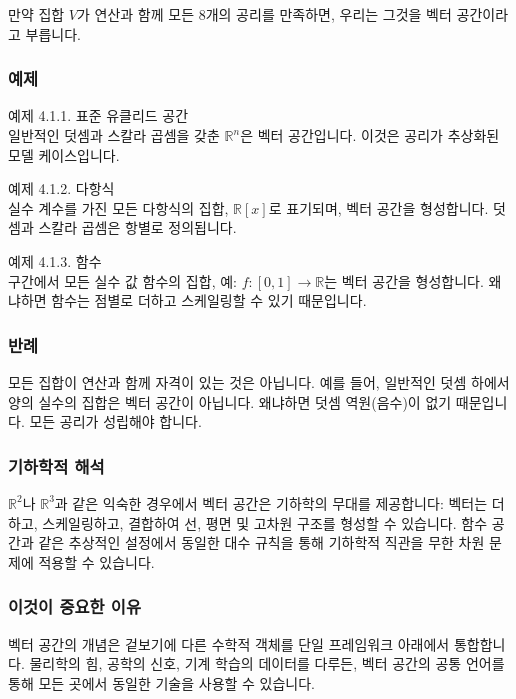 \documentclass[
  12pt,
  a4paper,
]{article}
\begin{document}
만약 집합 \(V\)가 연산과 함께 모든 8개의 공리를 만족하면, 우리는 그것을 벡터 공간이라고 부릅니다.

\subsubsection{예제}\label{examples-2}

예제 4.1.1. 표준 유클리드 공간\\
일반적인 덧셈과 스칼라 곱셈을 갖춘 \(\mathbb{R}^n\)은 벡터 공간입니다. 이것은 공리가 추상화된 모델 케이스입니다.

예제 4.1.2. 다항식\\
실수 계수를 가진 모든 다항식의 집합, \(\mathbb{R}[x]\)로 표기되며, 벡터 공간을 형성합니다. 덧셈과 스칼라 곱셈은 항별로 정의됩니다.

예제 4.1.3. 함수\\
구간에서 모든 실수 값 함수의 집합, 예: \(f: [0,1] \to \mathbb{R}\)는 벡터 공간을 형성합니다. 왜냐하면 함수는 점별로 더하고 스케일링할 수 있기 때문입니다.

\subsubsection{반례}\label{non-examples}

모든 집합이 연산과 함께 자격이 있는 것은 아닙니다. 예를 들어, 일반적인 덧셈 하에서 양의 실수의 집합은 벡터 공간이 아닙니다. 왜냐하면 덧셈 역원(음수)이 없기 때문입니다. 모든 공리가 성립해야 합니다.

\subsubsection{기하학적 해석}\label{geometric-interpretation-4}

\(\mathbb{R}^2\)나 \(\mathbb{R}^3\)과 같은 익숙한 경우에서 벡터 공간은 기하학의 무대를 제공합니다: 벡터는 더하고, 스케일링하고, 결합하여 선, 평면 및 고차원 구조를 형성할 수 있습니다. 함수 공간과 같은 추상적인 설정에서 동일한 대수 규칙을 통해 기하학적 직관을 무한 차원 문제에 적용할 수 있습니다.

\subsubsection{이것이 중요한 이유}\label{why-this-matters-12}

벡터 공간의 개념은 겉보기에 다른 수학적 객체를 단일 프레임워크 아래에서 통합합니다. 물리학의 힘, 공학의 신호, 기계 학습의 데이터를 다루든, 벡터 공간의 공통 언어를 통해 모든 곳에서 동일한 기술을 사용할 수 있습니다.
\end{document}
